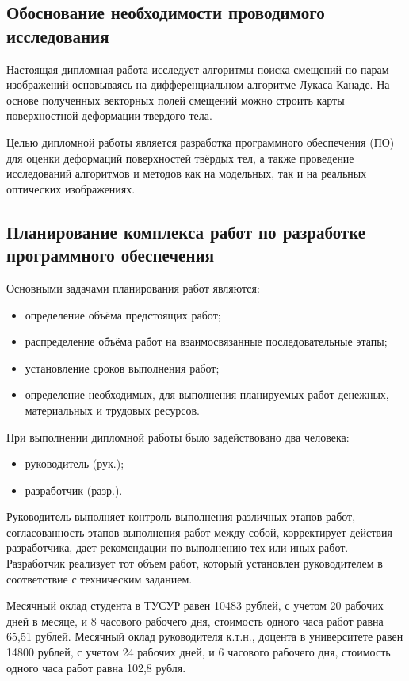 \subsection{Обоснование необходимости проводимого исследования}
Настоящая дипломная работа исследует алгоритмы поиска смещений по парам изображений основываясь на дифференциальном алгоритме Лукаса-Канаде. На основе полученных векторных полей смещений можно строить карты поверхностной деформации твердого тела.

Целью дипломной работы является разработка программного обеспечения (ПО) для оценки деформаций поверхностей твёрдых тел, а также проведение исследований алгоритмов и методов как на модельных, так и на реальных оптических изображениях.

\subsection{Планирование комплекса работ по разработке программного обеспечения}
Основными задачами планирования работ являются:

\begin{itemize}
\item определение объёма предстоящих работ;
\item распределение объёма работ на взаимосвязанные последовательные этапы;
\end{itemize}

\begin{itemize}
\item установление сроков выполнения работ;
\item определение необходимых, для выполнения планируемых работ денежных, материальных и трудовых ресурсов.
\end{itemize}
При выполнении дипломной работы было задействовано два человека:

\begin{itemize}
\item руководитель (рук.);
\item разработчик (разр.).
\end{itemize}

Руководитель выполняет контроль выполнения различных этапов работ, согласованность этапов выполнения работ между собой, корректирует действия разработчика, дает рекомендации по выполнению тех или иных работ. Разработчик реализует тот объем работ, который установлен руководителем в соответствие с техническим заданием.

Месячный оклад студента в ТУСУР равен 10483 рублей, с учетом 20 рабочих дней в месяце, и 8 часового рабочего дня, стоимость одного часа работ равна 65,51 рублей. Месячный оклад руководителя к.т.н., доцента в университете равен 14800 рублей, с учетом 24 рабочих дней, и 6 часового рабочего дня, стоимость одного часа работ равна 102,8 рубля.

